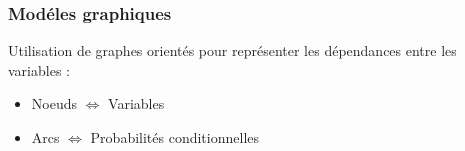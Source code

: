 \begin{frame}
  \frametitle{Modéles graphiques}
  Utilisation de graphes orientés pour représenter les dépendances entre les variables :
  \begin{itemize}
  \item Noeuds $\Leftrightarrow$ Variables
  \item Arcs $\Leftrightarrow$ Probabilités conditionnelles
  \end{itemize}
\end{frame}

